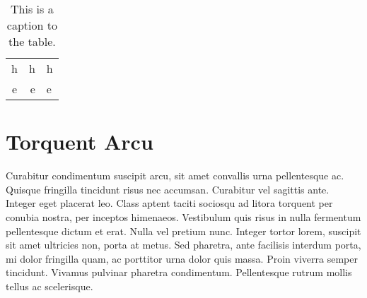 \begin{table}
    \begin{center}
    \begin{tabular}{c | r l}
        h & h & h \\
        e & e & e \\
    \end{tabular}
    \end{center}
    \caption{This is a caption to the table.}
    \label{myTable}
\end{table}

\section{Torquent Arcu}
Curabitur condimentum suscipit arcu, sit amet convallis urna pellentesque ac. Quisque fringilla tincidunt risus nec accumsan. Curabitur vel sagittis ante. Integer eget placerat leo. Class aptent taciti sociosqu ad litora torquent per conubia nostra, per inceptos himenaeos. Vestibulum quis risus in nulla fermentum pellentesque dictum et erat. Nulla vel pretium nunc. Integer tortor lorem, suscipit sit amet ultricies non, porta at metus. Sed pharetra, ante facilisis interdum porta, mi dolor fringilla quam, ac porttitor urna dolor quis massa. Proin viverra semper tincidunt. Vivamus pulvinar pharetra condimentum. Pellentesque rutrum mollis tellus ac scelerisque.


